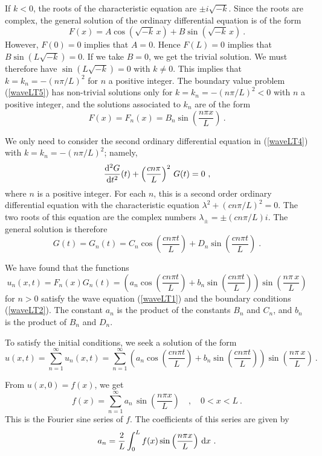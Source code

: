 If $k<0$, the roots of the characteristic equation are $\pm i \sqrt{-k}$.
Since the roots are complex, the general solution of the ordinary
differential equation is of the form
\[
F(x) = A \cos\left(\sqrt{-k}\,x\right) + B \sin\left(\sqrt{-k}\,x\right) \ .
\]
However, $F(0)=0$ implies that $A =0$.  Hence $F(L)=0$ implies that
$\displaystyle B \sin\left(L\sqrt{-k}\right) = 0$.  If we take $B=0$,
we get the trivial solution.  We must therefore have
$\displaystyle \sin\left(L\sqrt{-k}\right) = 0$ with $k\neq 0$.  This implies
that $\displaystyle k = k_n = -\left(n\pi/L\right)^2$ for $n$ a
positive integer.  The boundary value problem (\ref{waveLT5}) has non-trivial
solutions only for $\displaystyle k=k_n=-\left(n\pi/L\right)^2<0$ with
$n$ a positive integer, and the solutions associated to $k_n$ are of the form
\[
F(x)=F_n(x) = B_n \sin\left(\frac{n\pi x}{L}\right) \ .
\]

We only need to consider the second ordinary differential equation in
(\ref{waveLT4}) with $\displaystyle k=k_n=-\left(n\pi/L\right)^2$;
namely,
\[
\frac{\mathrm{d}^{2}{G}}{\mathrm{d}{t}^{2}}(t) + \left(\frac{c n\pi}{L}\right)^2\,G(t) = 0 \ ,
\]
where $n$ is a positive integer.  For each $n$, this is a second order
ordinary differential equation with the characteristic equation
$\displaystyle \lambda^2 + (c n\pi/L)^2=0$.  The two
roots of this equation are the complex numbers
$\displaystyle \lambda_{\pm} = \pm (c n\pi/L)i$.
The general solution is therefore
\[
G(t) = G_n(t) = C_n \cos\left(\frac{cn\pi t}{L}\right)
+ D_n \sin\left(\frac{cn\pi t}{L}\right) \; .
\]

We have found that the functions
\[
u_n(x,t) = F_n(x)G_n(t) =
\left( a_n \cos\left(\frac{cn\pi t}{L}\right)
+ b_n \sin\left(\frac{cn\pi t}{L}\right) \right)
\sin\left(\frac{n\pi\,x}{L}\right)
\]
for $n>0$ satisfy the wave equation (\ref{waveLT1}) and the boundary
conditions (\ref{waveLT2}).   The constant $a_n$ is the product of the
constants $B_n$ and $C_n$, and $b_n$ is the product of $B_n$ and $D_n$.

To satisfy the initial conditions, we seek a solution of the form
\[
u(x,t) = \sum_{n=1}^\infty u_n(x,t)
= \sum_{n=1}^\infty
\left( a_n \cos\left(\frac{cn\pi t}{L}\right)
+ b_n \sin\left(\frac{cn\pi t}{L}\right) \right)
\sin\left(\frac{n\pi\,x}{L}\right) \ .
\]

From $u(x,0) = f(x)$, we get
\[
f(x) = \sum_{n=1}^\infty a_n\,\sin\left(\frac{n\pi x}{L}\right)
\quad , \quad 0<x<L \ .
\]
This is the Fourier sine series of $f$.  The coefficients of
this series are given by
\[
a_n = \frac{2}{L} \int_0^L f(x)
\sin\left(\frac{n\pi x}{L}\right) \,\mathrm{d}x \ .
\]

